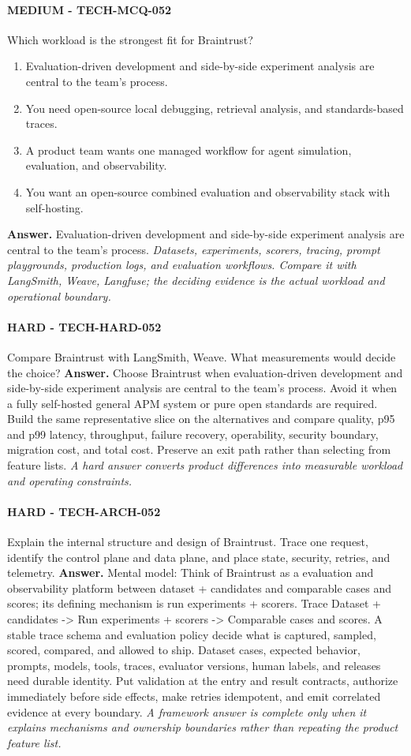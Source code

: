 \paragraph{MEDIUM - TECH-MCQ-052} Which workload is the strongest fit for Braintrust?
\begin{enumerate}[label=\Alph*.]
\item Evaluation-driven development and side-by-side experiment analysis are central to the team's process.
\item You need open-source local debugging, retrieval analysis, and standards-based traces.
\item A product team wants one managed workflow for agent simulation, evaluation, and observability.
\item You want an open-source combined evaluation and observability stack with self-hosting.
\end{enumerate}
\textbf{Answer.} Evaluation-driven development and side-by-side experiment analysis are central to the team's process.
\textit{Datasets, experiments, scorers, tracing, prompt playgrounds, production logs, and evaluation workflows. Compare it with LangSmith, Weave, Langfuse; the deciding evidence is the actual workload and operational boundary.}
\paragraph{HARD - TECH-HARD-052} Compare Braintrust with LangSmith, Weave. What measurements would decide the choice?
\textbf{Answer.} Choose Braintrust when evaluation-driven development and side-by-side experiment analysis are central to the team's process. Avoid it when a fully self-hosted general APM system or pure open standards are required. Build the same representative slice on the alternatives and compare quality, p95 and p99 latency, throughput, failure recovery, operability, security boundary, migration cost, and total cost. Preserve an exit path rather than selecting from feature lists.
\textit{A hard answer converts product differences into measurable workload and operating constraints.}
\paragraph{HARD - TECH-ARCH-052} Explain the internal structure and design of Braintrust. Trace one request, identify the control plane and data plane, and place state, security, retries, and telemetry.
\textbf{Answer.} Mental model: Think of Braintrust as a evaluation and observability platform between dataset + candidates and comparable cases and scores; its defining mechanism is run experiments + scorers. Trace Dataset + candidates -> Run experiments + scorers -> Comparable cases and scores. A stable trace schema and evaluation policy decide what is captured, sampled, scored, compared, and allowed to ship. Dataset cases, expected behavior, prompts, models, tools, traces, evaluator versions, human labels, and releases need durable identity. Put validation at the entry and result contracts, authorize immediately before side effects, make retries idempotent, and emit correlated evidence at every boundary.
\textit{A framework answer is complete only when it explains mechanisms and ownership boundaries rather than repeating the product feature list.}
